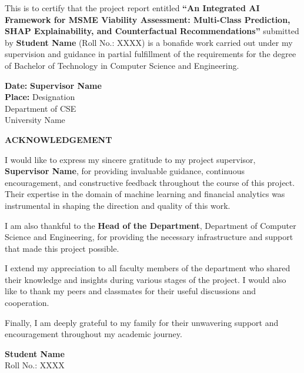 \documentclass[12pt,a4paper]{report}
\begin{document}
This is to certify that the project report entitled \textbf{``An Integrated AI Framework for MSME Viability Assessment: Multi-Class Prediction, SHAP Explainability, and Counterfactual Recommendations''} submitted by \textbf{Student Name} (Roll No.: XXXX) is a bonafide work carried out under my supervision and guidance in partial fulfillment of the requirements for the degree of Bachelor of Technology in Computer Science and Engineering.

\vspace{3cm}
\begin{flushleft}
\textbf{Date:} \hfill \textbf{Supervisor Name}\\
\textbf{Place:} \hfill Designation\\
\hfill Department of CSE\\
\hfill University Name
\end{flushleft}

\newpage
\thispagestyle{empty}
\begin{center}
{\Large\bfseries ACKNOWLEDGEMENT\\[1cm]}
\end{center}

I would like to express my sincere gratitude to my project supervisor, \textbf{Supervisor Name}, for providing invaluable guidance, continuous encouragement, and constructive feedback throughout the course of this project. Their expertise in the domain of machine learning and financial analytics was instrumental in shaping the direction and quality of this work.

I am also thankful to the \textbf{Head of the Department}, Department of Computer Science and Engineering, for providing the necessary infrastructure and support that made this project possible.

I extend my appreciation to all faculty members of the department who shared their knowledge and insights during various stages of the project. I would also like to thank my peers and classmates for their useful discussions and cooperation.

Finally, I am deeply grateful to my family for their unwavering support and encouragement throughout my academic journey.

\vspace{2cm}
\begin{flushright}
\textbf{Student Name}\\
Roll No.: XXXX
\end{flushright}
\end{document}
